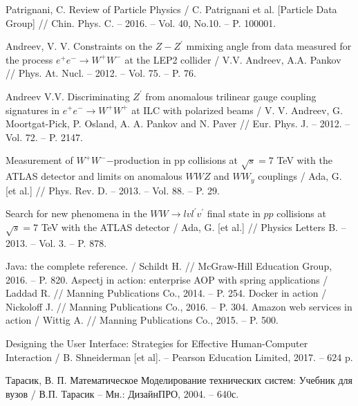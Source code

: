 	Patrignani, C. Review of Particle Physics 
	/ C. Patrignani et al. [Particle Data Group]
	// Chin. Phys. C. – 2016. – Vol. 40, No.10. – P. 100001.
	

	Andreev, V. V. Constraints on the $Z-Z^\prime$ mmixing angle from data measured for the process $e^+e^- \rightarrow W^+W^-$ at the LEP2 collider
	/ V.V. Andreev, A.A. Pankov
	// Phys. At. Nucl. – 2012. – Vol. 75. – P. 76.
	
	Andreev V.V. Discriminating ${Z}^\prime$ from anomalous trilinear gauge coupling
	signatures in ${e}^{+}{e}^{-} \rightarrow {W}^{+}{W}^{+}$
	at ILC with polarized beams / V. V. Andreev, G.
	Moortgat-Pick, P. Osland, A. A. Pankov and N. Paver // Eur. Phys. J. – 2012. – Vol. 72. – P. 2147.

	Measurement of $W^+W^-$−production in pp collisions at $\sqrt{s}=7$ TeV with the ATLAS detector and limits on anomalous $WWZ$ and $WW_y$ couplings
	/ Ada, G. [et al.] 
	// Phys. Rev. D. – 2013. – Vol. 88. – P. 29.
	
	Search for new phenomena in the $WW \rightarrow lvl^{\prime}v^{\prime}$ final state in $pp$ collisions at $\sqrt{s}=7$ TeV with the ATLAS detector
	/ Ada, G. [et al.] 
	// Physics Letters B. – 2013. – Vol. 3. – P. 878.




	Java: the complete reference. 
	/ Schildt H. 
	// McGraw-Hill Education Group, 2016. – P. 820.
	Aspectj in action: enterprise AOP with spring applications
	/ Laddad R. 
	// Manning Publications Co., 2014. – P. 254.
	Docker in action
	/ Nickoloff J.
	// Manning Publications Co., 2016. – P. 304.
	Amazon web services in action
	/ Wittig A.
	// Manning Publications Co., 2015. – P. 500.


	 
	 Designing the User Interface: Strategies for Effective Human-Computer
	 Interaction
	 / B. Shneiderman [et al]. – Pearson Education Limited, 2017. – 624 p. 

	 


	 
	Тарасик, В. П. Математическое Моделирование технических систем:
	Учебник для вузов / В.П. Тарасик – Мн.: ДизайнПРО‚ 2004. – 640с.
	




